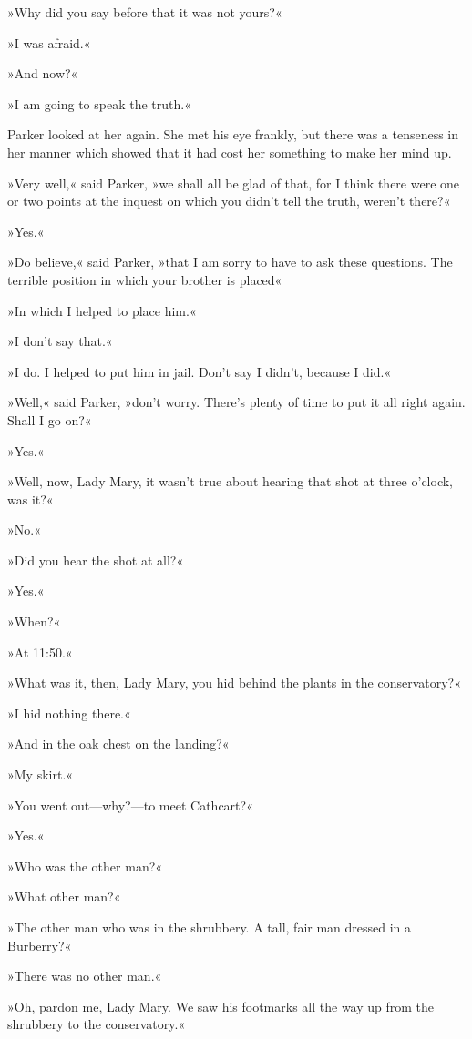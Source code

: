 »Why did you say before that it was not yours?«

»I was afraid.«

»And now?«

»I am going to speak the truth.«

Parker looked at her again. She met his eye frankly, but there was a tenseness in her manner which showed that it had cost her something to make her mind up.

»Very well,« said Parker, »we shall all be glad of that, for I think there were one or two points at the inquest on which you didn't tell the truth, weren't there?«

»Yes.«

»Do believe,« said Parker, »that I am sorry to have to ask these questions. The terrible position in which your brother is placed\longdash«

»In which I helped to place him.«

»I don't say that.«

»I do. I helped to put him in jail. Don't say I didn't, because I did.«

»Well,« said Parker, »don't worry. There's plenty of time to put it all right again. Shall I go on?«

»Yes.«

»Well, now, Lady Mary, it wasn't true about hearing that shot at three o'clock, was it?«

»No.«

»Did you hear the shot at all?«

»Yes.«

»When?«

»At 11:50.«

»What was it, then, Lady Mary, you hid behind the plants in the conservatory?«

»I hid nothing there.«

»And in the oak chest on the landing?«

»My skirt.«

»You went out\allowbreak---\allowbreak why?---to meet Cathcart?«

»Yes.«

»Who was the other man?«

»What other man?«

»The other man who was in the shrubbery. A tall, fair man dressed in a Burberry?«

»There was no other man.«

»Oh, pardon me, Lady Mary. We saw his footmarks all the way up from the shrubbery to the conservatory.«

